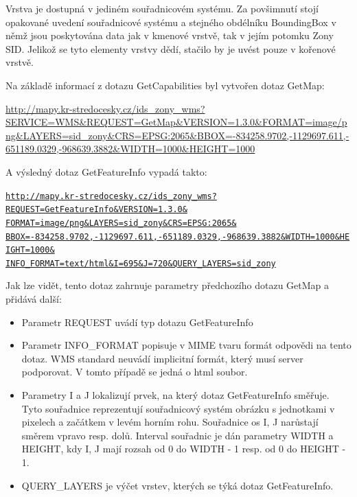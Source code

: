 \documentclass[a4paper,12pt]{article}
\begin{document}
Vrstva je dostupná v jediném souřadnicovém systému. Za povšimnutí
stojí opakované uvedení souřadnicové systému a stejného obdélníku
BoundingBox v němž jsou poskytována data jak v kmenové vrstvě, tak v
jejím potomku Zony SID. Jelikož se tyto elementy vrstvy dědí, stačilo
by je uvést pouze v kořenové vrstvě.

Na základě informací z dotazu GetCapabilities byl vytvořen dotaz
GetMap:

\url{http://mapy.kr-stredocesky.cz/ids_zony_wms?SERVICE=WMS&REQUEST=GetMap&VERSION=1.3.0&FORMAT=image/png&LAYERS=sid_zony&CRS=EPSG:2065&BBOX=-834258.9702,-1129697.611,-651189.0329,-968639.3882&WIDTH=1000&HEIGHT=1000}

A výsledný dotaz GetFeatureInfo vypadá takto:
\newcommand{\StredoceskyGetFeatureInfo}{http://mapy.kr-stredocesky.cz/ids_zony_wms?REQUEST=GetFeatureInfo&VERSION=1.3.0&FORMAT=image/png&LAYERS=sid_zony&CRS=EPSG:2065&BBOX=-834258.9702,-1129697.611,-651189.0329,-968639.3882&WIDTH=1000&HEIGHT=1000&INFO_FORMAT=text/html&I=695&J=720&QUERY_LAYERS=sid_zony}
\begin{alltt}\footnotesize
\href{\StredoceskyGetFeatureInfo}{http://mapy.kr-stredocesky.cz/ids\_zony\_wms?}
\href{\StredoceskyGetFeatureInfo}{REQUEST=GetFeatureInfo\&VERSION=1.3.0\&}
\href{\StredoceskyGetFeatureInfo}{FORMAT=image/png\&LAYERS=sid\_zony\&CRS=EPSG:2065\&}
\href{\StredoceskyGetFeatureInfo}{BBOX=-834258.9702,-1129697.611,-651189.0329,-968639.3882\&WIDTH=1000\&HEIGHT=1000\&}
\href{\StredoceskyGetFeatureInfo}{INFO\_FORMAT=text/html\&I=695\&J=720\&QUERY\_LAYERS=sid\_zony}
\end{alltt}


Jak lze vidět, tento dotaz zahrnuje parametry předchozího dotazu
GetMap a přidává další:
\begin{itemize}
  \item Parametr REQUEST uvádí typ dotazu GetFeatureInfo 
  \item Parametr INFO\_FORMAT popisuje v MIME tvaru formát odpovědi na tento dotaz. WMS standard neuvádí implicitní formát, který musí server podporovat. V tomto případě se jedná o html soubor. 
  \item Parametry I a J lokalizují prvek, na který dotaz GetFeatureInfo směřuje. Tyto souřadnice reprezentují souřadnicový systém obrázku s jednotkami v pixelech a začátkem v levém horním rohu. Souřadnice os I, J narůstají  
        směrem vpravo resp. dolů. Interval souřadnic je dán parametry WIDTH a HEIGHT, kdy I, J mají rozsah od 0 do WIDTH - 1 resp. od 0 do HEIGHT - 1.  
  \item QUERY\_LAYERS je výčet vrstev, kterých se týká dotaz GetFeatureInfo. 
\end{itemize}
\end{document}
